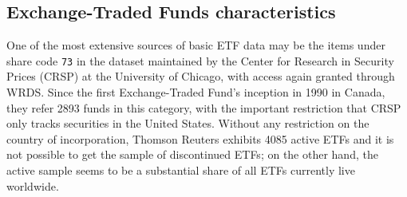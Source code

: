 \subsection{Exchange-Traded Funds characteristics}
One of the most extensive sources of basic ETF data may be the items under share code \texttt{73} in the dataset maintained by the Center for Research in Security Prices (CRSP) at the University of Chicago, with access again granted through WRDS. Since the first Exchange-Traded Fund's inception in 1990 in Canada, they refer 2893 funds in this category, with the important restriction that CRSP only tracks securities in the United States. Without any restriction on the country of incorporation, Thomson Reuters exhibits 4085 active ETFs and it is not possible to get the sample of discontinued ETFs; on the other hand, the active sample seems to be a substantial share of all ETFs currently live worldwide.

